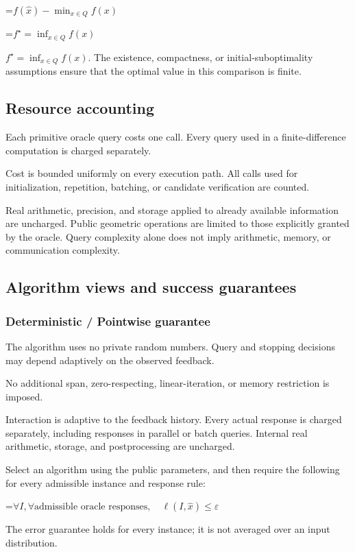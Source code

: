 \documentclass[10pt,a4paper]{article}
\newcommand{\AtlasMath}[1]{\par\begingroup\centering\setbox0=\hbox{$\displaystyle #1$}\ifdim\wd0>1.4\linewidth\typeout{ATLAS WIDE FORMULA: \the\wd0}\fi\ifdim\wd0>\linewidth\resizebox{\linewidth}{!}{\box0}\else\box0\fi\par\endgroup}
\newcommand{\AtlasInlineMath}[1]{\begingroup\setbox0=\hbox{$#1$}\ifdim\wd0>.4\linewidth\endgroup\AtlasMath{#1}\else\endgroup$#1$\fi}
\begin{document}
\AtlasMath{f(\widehat{x})-\min_{x\in Q}f(x)}


\AtlasInlineMath{f^\star=\inf_{x\in Q}f(x)}. The existence, compactness, or initial-suboptimality assumptions ensure that the optimal value in this comparison is finite.

\subsection{Resource accounting}
Each primitive oracle query costs one call. Every query used in a finite-difference computation is charged separately.

Cost is bounded uniformly on every execution path. All calls used for initialization, repetition, batching, or candidate verification are counted.

Real arithmetic, precision, and storage applied to already available information are uncharged. Public geometric operations are limited to those explicitly granted by the oracle. Query complexity alone does not imply arithmetic, memory, or communication complexity.

\subsection{Algorithm views and success guarantees}
\subsubsection{Deterministic / Pointwise guarantee}
The algorithm uses no private random numbers. Query and stopping decisions may depend adaptively on the observed feedback.

No additional span, zero-respecting, linear-iteration, or memory restriction is imposed.

Interaction is adaptive to the feedback history. Every actual response is charged separately, including responses in parallel or batch queries. Internal real arithmetic, storage, and postprocessing are uncharged.

Select an algorithm using the public parameters, and then require the following for every admissible instance and response rule:


\AtlasMath{\forall I,\forall\text{admissible oracle responses},\quad\ell(I,\widehat{x})\le\varepsilon}


The error guarantee holds for every instance; it is not averaged over an input distribution.
\end{document}
